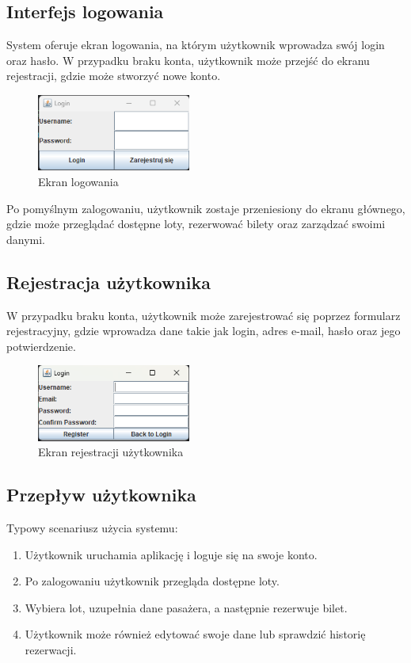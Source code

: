 \subsection{Interfejs logowania}
System oferuje ekran logowania, na którym użytkownik wprowadza swój login oraz hasło. W przypadku braku konta, użytkownik może przejść do ekranu rejestracji, gdzie może stworzyć nowe konto.

\begin{figure}[H]
\centering
\includegraphics[width=0.45\textwidth]{figures/4.png}
\caption{Ekran logowania}
\label{fig:login_screen}
\end{figure}

Po pomyślnym zalogowaniu, użytkownik zostaje przeniesiony do ekranu głównego, gdzie może przeglądać dostępne loty, rezerwować bilety oraz zarządzać swoimi danymi.

\subsection{Rejestracja użytkownika}
W przypadku braku konta, użytkownik może zarejestrować się poprzez formularz rejestracyjny, gdzie wprowadza dane takie jak login, adres e-mail, hasło oraz jego potwierdzenie.

\begin{figure}[H]
\centering
\includegraphics[width=0.45\textwidth]{figures/5.png}
\caption{Ekran rejestracji użytkownika}
\label{fig:register_screen}
\end{figure}

\subsection{Przepływ użytkownika}
Typowy scenariusz użycia systemu:
\begin{enumerate}
\item Użytkownik uruchamia aplikację i loguje się na swoje konto.
\item Po zalogowaniu użytkownik przegląda dostępne loty.
\item Wybiera lot, uzupełnia dane pasażera, a następnie rezerwuje bilet.
\item Użytkownik może również edytować swoje dane lub sprawdzić historię rezerwacji.
\end{enumerate}

